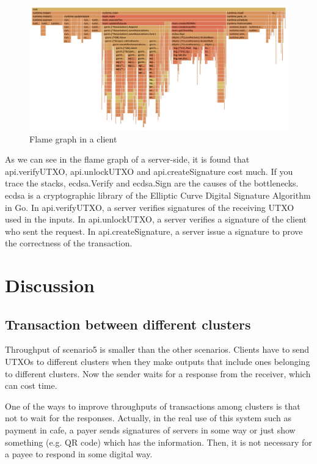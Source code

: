 \documentclass[a4paper, oneside]{discothesis}
\begin{document}
\begin{figure}
    \begin{center}
        \includegraphics[width=\columnwidth]{figures/client_flame_graph}
        \caption{Flame graph in a client}
        \label{fig:client-fg}
    \end{center}
\end{figure}

As we can see in the flame graph of a server-side, %
it is found that api.verifyUTXO, api.unlockUTXO and api.createSignature cost much.
If you trace the stacks, ecdsa.Verify and ecdsa.Sign are the causes of the bottlenecks.
ecdsa is a cryptographic library of the Elliptic Curve Digital Signature Algorithm in Go.
In api.verifyUTXO, a server verifies signatures of the receiving UTXO used in the inputs.
In api.unlockUTXO, a server verifies a signature of the client who sent the request.
In api.createSignature, a server issue a signature to prove the correctness of the transaction.

\section{Discussion}


\subsection{Transaction between different clusters}
Throughput of scenario5 is smaller than the other scenarios.
Clients have to send UTXOs to different clusters
when they make outputs that include ones belonging to different clusters.
Now the sender waits for a response from the receiver, which can cost time.

One of the ways to improve throughputs of transactions among clusters
is that not to wait for the responses.
Actually, in the real use of this system such as payment in cafe,
a payer sends signatures of servers in some way or just show something (e.g. QR code)
which has the information.
Then, it is not necessary for a payee to respond in some digital way.
\end{document}
